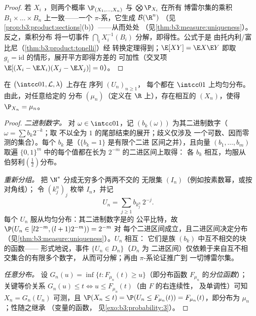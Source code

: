 \begin{proof}
若 $X_i$ ，则两个概率
$\P_{(X_1,\dots,X_n)}$ 与 $\bigotimes\P_{X_i}$ 在所有
博雷尔集的乘积 $B_1\times\dots\times B_n$ 上一致——一个
$\pi$-系，它生成 $\mathcal B(\R^n)$
（见\cref{prop:b3:product:sections}(b)）——从而处处
（见\cref{thm:b3:measure:uniqueness}）。反之，乘积分布
将一切事件 $\bigcap_iX_i^{-1}(B_i)$ 分解，即得性。公式于是
由托内利/富比尼（\cref{thm:b3:product:tonelli}）经
转换定理得到；$\E[XY] = \E X\E Y$ 即取 $g_i =
\mathrm{id}$ 的情形，展开平方即得方差的
可加性（交叉项 $\E[(X_i - \E X_i)(X_j - \E X_j)]
= 0$）。
\end{proof}

\begin{theorem}[独立序列的存在性]
\label{thm:b3:probability:existence}
在 $\bigl(\intcc01, \mathcal L, \lambda\bigr)$ 上存在
序列 $(U_n)_{n\geq1}$，
每个都在 $\intcc01$ 上均匀分布。由此，对任意给定的
分布 $(\mu_n)$（定义在 $\R$ 上），存在相互的 $(X_n)$，使得
$\P_{X_n} = \mu_n$。
\end{theorem}

\begin{proof}
\emph{二进制数字。} 对 $\omega \in \intcc01$，记 $(b_k(\omega))$
为其二进制数字（$\omega = \sum b_k2^{-k}$；取
不以全为 $1$ 的尾部结束的展开；歧义仅涉及
一个可数、因而零测的集合）。每个 $b_k$ 是（$\{b_k = 1\}$ 是有限个二进
区间之并），且向量 $(b_1, \dots, b_m)$ 取遍
$\{0,1\}^m$ 中的每个值都在长为 $2^{-m}$ 的二进区间上取得：
各 $b_k$ 相互，均服从伯努利$(\frac12)$分布。

\emph{重新分组。} 把 $\N^*$ 分成无穷多个两两不交的
无限集 $(I_n)$（例如按素数幂，或按对角线）；
令 $(k^n_j)_j$ 枚举 $I_n$，并记
\[
U_n = \sum_{j\geq1} b_{k^n_j}\,2^{-j} .
\]
每个 $U_n$ 服从均匀分布：其二进制数字是的
公平比特，故 $\P(U_n \in [l2^{-m}, (l+1)2^{-m})) = 2^{-m}$ 对
每个二进区间成立，且二进区间决定分布
（见\cref{thm:b3:measure:uniqueness}）。$U_n$ 相互：
它们是族 $(b_k)$ 中互不相交的块的函数——
形式地说，事件 $\{U_n \in D_n\}$（$D_n$ 为
二进区间）仅依赖于来自互不相交集合的有限多个数字，
从而可分解；再由 $\pi$-系论证推广到
一切博雷尔集。

\emph{任意分布。} 设 $G_n(u) = \inf\{t : F_{\mu_n}(t)
\geq u\}$（即分布函数 $F_{\mu_n}$ 的\emph{分位函数}）；
关键等价关系 $G_n(u) \leq t
\iff u \leq F_{\mu_n}(t)$（由 $F$ 的右连续性，
及单调性）可知 $X_n = G_n(U_n)$ 可测，且
$\P(X_n \leq t) = \P(U_n \leq F_{\mu_n}(t)) =
F_{\mu_n}(t)$，即分布为 $\mu_n$；性随之继承
（变量的函数，
见\cref{exo:b3:probability:3}）。
\end{proof}

